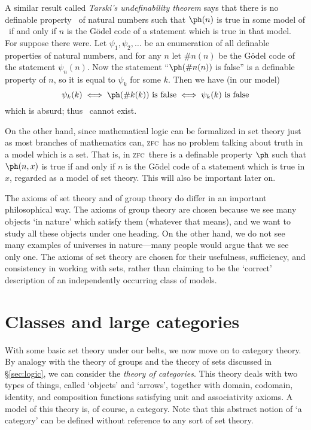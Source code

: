 \documentclass{amsart}
\def\zfc{\textsc{zfc}}
\begin{document}
A similar result called \emph{Tarski's undefinability theorem} says
that there is no definable property \ph\ of natural numbers such that
$\ph(n)$ is true in some model of \cT\ if and only if $n$ is the
G\"odel code of a statement which is true in that model.  For suppose
there were.  Let $\psi_1,\psi_2,\dots$ be an enumeration of all
definable properties of natural numbers, and for any $n$ let $\#n(n)$
be the G\"odel code of the statement $\psi_n(n)$.  Now the statement
``$\ph(\#n(n))$ is false'' is a definable property of $n$, so it is
equal to $\psi_k$ for some $k$.  Then we have (in our model)
\[\psi_k(k) \iff \ph(\#k(k)) \text{ is false} \iff \psi_k(k) \text{ is
  false}\] which is absurd; thus \ph\ cannot exist.

On the other hand, since mathematical logic can be formalized in set
theory just as most branches of mathematics can, \zfc\ has no
problem talking about truth in a model which is a set.  That is, in
\zfc\ there is a definable property $\ph$ such that $\ph(n,x)$ is true
if and only if $n$ is the G\"odel code of a statement which is true in
$x$, regarded as a model of set theory.  This will also be important
later on.

\begin{rmk}
  The axioms of set theory and of group theory do differ in an
  important philosophical way.  The axioms of group theory are chosen
  because we see many objects `in nature' which satisfy them (whatever
  that means), and we want to study all these objects under one
  heading.  On the other hand, we do not see many examples of
  universes in nature---many people would argue that we see only one.
  The axioms of set theory are chosen for their usefulness,
  sufficiency, and consistency in working with sets, rather than
  claiming to be the `correct' description of an independently
  occurring class of models.
\end{rmk}


\section{Classes and large categories}
\label{sec:classes}

With some basic set theory under our belts, we now move on to category
theory.  By analogy with the theory of groups and the theory of sets
discussed in \S\ref{sec:logic}, we can consider the \emph{theory of
  categories}.  This theory deals with two types of things, called
`objects' and `arrows', together with domain, codomain, identity, and
composition functions satisfying unit and associativity axioms.  A
model of this theory is, of course, a category.  Note that this
abstract notion of `a category' can be defined without reference to
any sort of set theory.
\end{document}
